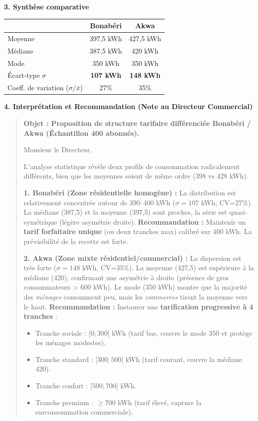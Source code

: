 \documentclass[11pt]{article}
\begin{document}
\begin{exoresolu}
\noindent \textbf{3. Synthèse comparative}
\begin{center}
\begin{tabular}{|l|c|c|}\hline
& \textbf{Bonabéri} & \textbf{Akwa} \\ \hline
Moyenne & 397,5 kWh & 427,5 kWh \\
Médiane & 387,5 kWh & 420 kWh \\
Mode & 350 kWh & 350 kWh \\
Écart-type $\sigma$ & \textbf{107 kWh} & \textbf{148 kWh} \\
Coeff. de variation ($\sigma/\bar{x}$) & 27\% & 35\% \\ \hline
\end{tabular}
\end{center}

\noindent \textbf{4. Interprétation et Recommandation (Note au Directeur Commercial)}

\begin{quote}
\textbf{Objet : Proposition de structure tarifaire différenciée Bonabéri / Akwa (Échantillon 400 abonnés).}

Monsieur le Directeur,

L'analyse statistique révèle deux profils de consommation radicalement différents, bien que les moyennes soient de même ordre (398 vs 428 kWh).

\textbf{1. Bonabéri (Zone résidentielle homogène) :} La distribution est relativement concentrée autour de 390--400 kWh ($\sigma = 107$ kWh, CV=27\%). La médiane (387,5) et la moyenne (397,5) sont proches, la série est quasi-symétrique (légère asymétrie droite). \textbf{Recommandation :} Maintenir un \textbf{tarif forfaitaire unique} (ou deux tranches max) calibré sur 400 kWh. La prévisibilité de la recette est forte.

\textbf{2. Akwa (Zone mixte résidentiel/commercial) :} La dispersion est très forte ($\sigma = 148$ kWh, CV=35\%). La moyenne (427,5) est supérieure à la médiane (420), confirmant une asymétrie à droite (présence de gros consommateurs > 600 kWh). Le mode (350 kWh) montre que la majorité des \emph{ménages} consomment peu, mais les \emph{commerces} tirent la moyenne vers le haut. \textbf{Recommandation :} Instaurer une \textbf{tarification progressive à 4 tranches} :
\begin{itemize}
    \item Tranche sociale : $[0; 300[$ kWh (tarif bas, couvre le mode 350 et protège les ménages modestes).
    \item Tranche standard : $[300; 500[$ kWh (tarif courant, couvre la médiane 420).
    \item Tranche confort : $[500; 700[$ kWh.
    \item Tranche premium : $\ge 700$ kWh (tarif élevé, capture la surconsommation commerciale).
\end{itemize}


\end{quote}
\end{exoresolu}
\end{document}
